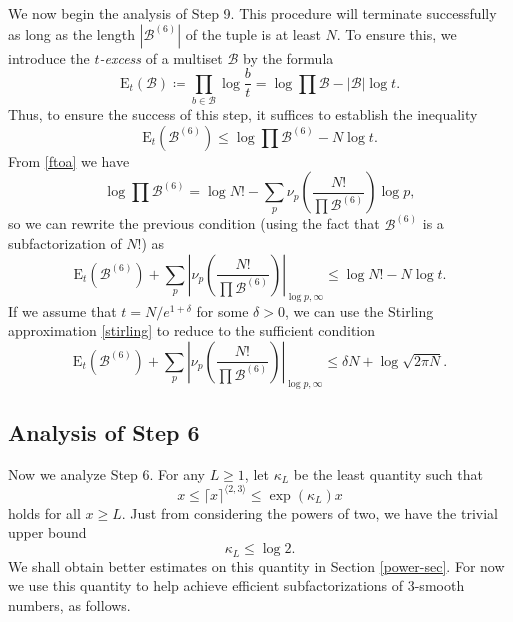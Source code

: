 \documentclass[12pt,a4paper,reqno]{amsart}
\numberwithin{equation}{section}
\theoremstyle{plain}
\theoremstyle{definition}
\newcommand\tuple{{\mathcal B}}
\newcommand\excess{{\mathrm{E}}}
\begin{document}
We now begin the analysis of Step 9.  This procedure will terminate successfully as long as the length $|\tuple^{(6)}|$ of the tuple is at least $N$.  To ensure this, we introduce the \emph{$t$-excess} of a multiset $\tuple$ by the formula
$$
\excess_t(\tuple) \coloneqq \prod_{b \in \tuple} \log \frac{b}{t} = \log \prod \tuple - |\tuple| \log t.$$
Thus, to ensure the success of this step, it suffices to establish the inequality
$$
\excess_t(\tuple^{(6)}) \leq \log \prod \tuple^{(6)} - N \log t.$$
From \eqref{ftoa} we have
$$ \log \prod \tuple^{(6)} = \log N! - \sum_p \nu_p\left(\frac{N!}{\prod \tuple^{(6)}}\right) \log p,$$
so we can rewrite the previous condition (using the fact that $\tuple^{(6)}$ is a subfactorization of $N!$) as
$$
\excess_t(\tuple^{(6)}) + \sum_p \left| \nu_p\left(\frac{N!}{\prod \tuple^{(6)}}\right) \right|_{\log p,\infty}
\leq \log N! - N \log t.$$
If we assume that $t = N/e^{1+\delta}$ for some $\delta > 0$, we can use the Stirling approximation \eqref{stirling} to reduce to the sufficient condition
\begin{equation}\label{step7-cond}
\excess_t(\tuple^{(6)}) + \sum_p \left| \nu_p\left(\frac{N!}{\prod \tuple^{(6)}}\right) \right|_{\log p,\infty}
\leq \delta N + \log \sqrt{2\pi N}.
\end{equation}

\subsection{Analysis of Step 6}

Now we analyze Step 6. For any $L \geq 1$, let $\kappa_L$ be the least quantity such that
\begin{equation}\label{kappa-def}  
  x \leq \lceil x \rceil^{\langle 2,3\rangle} \leq \exp(\kappa_L) x 
\end{equation}
holds for all $x \geq L$. Just from considering the powers of two, we have the trivial upper bound
\begin{equation}\label{kl-triv}
  \kappa_L \leq \log 2.
\end{equation}
We shall obtain better estimates on this quantity in Section \ref{power-sec}. For now we use this quantity to help achieve efficient subfactorizations of $3$-smooth numbers, as follows.
\end{document}
